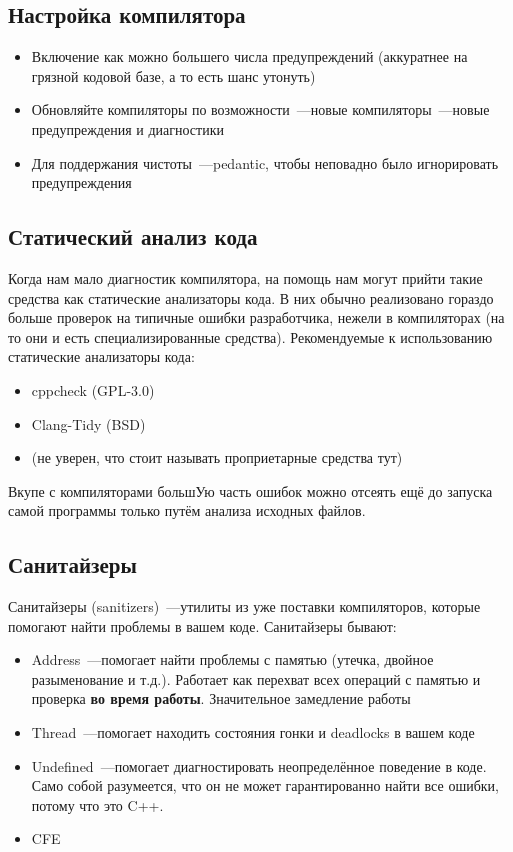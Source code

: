 \documentclass[10pt, a5paper]{article}
\begin{document}
\subsection*{Настройка компилятора}
\begin{itemize}
\item Включение как можно большего числа предупреждений (аккуратнее на грязной кодовой базе, а то есть шанс утонуть)
\item Обновляйте компиляторы по возможности~---новые компиляторы~---новые предупреждения и диагностики
\item Для поддержания чистоты~---pedantic, чтобы неповадно было игнорировать предупреждения
\end{itemize}
\subsection*{Статический анализ кода}

Когда нам мало диагностик компилятора, на помощь нам могут прийти такие средства как статические анализаторы кода. В них обычно реализовано гораздо больше проверок на типичные ошибки разработчика, нежели в компиляторах (на то они и есть специализированные средства). Рекомендуемые к использованию статические анализаторы кода:
\begin{itemize}
\item cppcheck (GPL-3.0)
\item Clang-Tidy (BSD)
\item (не уверен, что стоит называть проприетарные средства тут)
\end{itemize}
Вкупе с компиляторами большУю часть ошибок можно отсеять ещё до запуска самой программы только путём анализа исходных файлов.

\subsection*{Санитайзеры}

Санитайзеры (sanitizers)~---утилиты из уже поставки компиляторов, которые помогают найти проблемы в вашем коде.
Санитайзеры бывают:
\begin{itemize}
\item Address~---помогает найти проблемы с памятью (утечка, двойное разыменование и т.д.). Работает как перехват всех операций с памятью и проверка \textbf{во время работы}. Значительное замедление работы
\item Thread~---помогает находить состояния гонки и deadlocks в вашем коде
\item Undefined~---помогает диагностировать неопределённое поведение в коде. Само собой разумеется, что он не может гарантированно найти все ошибки, потому что это C++.
\item CFE
\end{itemize}
\end{document}
